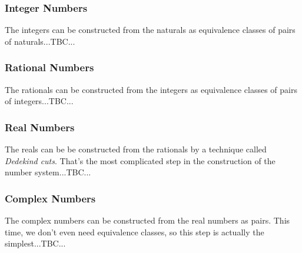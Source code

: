 \subsubsection{Integer Numbers} The integers can be constructed from the naturals as equivalence classes of pairs of naturals...TBC...

\subsubsection{Rational Numbers} The rationals can be constructed from the integers as equivalence classes of pairs of integers...TBC...

\subsubsection{Real Numbers} The reals can be be constructed from the rationals by a technique called \emph{Dedekind cuts}. That's the most complicated step in the construction of the number system...TBC...

\subsubsection{Complex Numbers} The complex numbers can be constructed from the real numbers as pairs. This time, we don't even need equivalence classes, so this step is actually the simplest...TBC...






